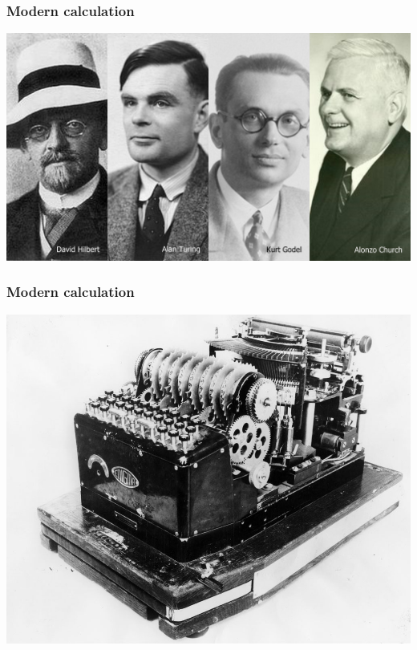 \documentclass[11pt]{beamer}
\begin{document}
\begin{frame}[fragile]
  \frametitle{Modern calculation}

  \includegraphics[width=\textwidth]{./img/turing-et-al.jpg}
\end{frame}

\begin{frame}[fragile]
  \frametitle{Modern calculation}

  \includegraphics[height=0.75\textheight]{./img/enigma.jpg}
\end{frame}
\end{document}
